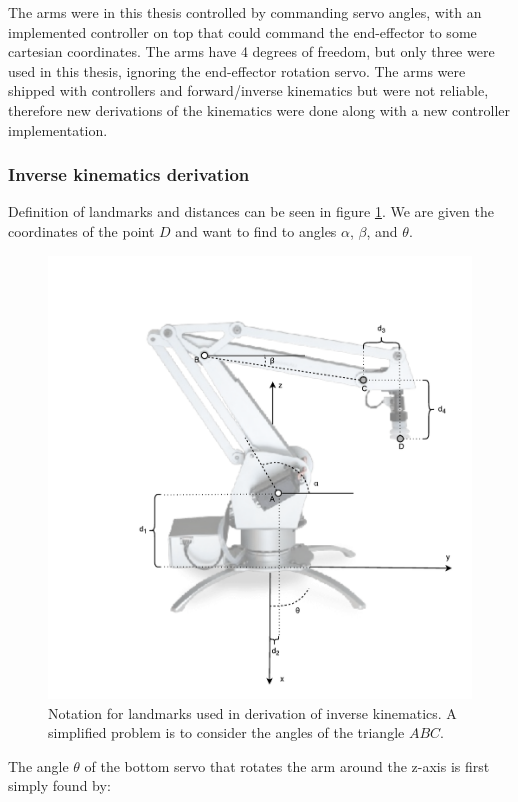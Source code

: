 The arms were in this thesis controlled by commanding servo angles, with an
implemented controller on top that could command the end-effector to some
cartesian coordinates. The arms have 4 degrees of freedom, but only three were
used in this thesis, ignoring the end-effector rotation servo. The arms were
shipped with controllers and forward/inverse kinematics but were not reliable,
therefore new derivations of the kinematics were done along with a new
controller implementation.

\subsubsection{Inverse kinematics derivation}

Definition of landmarks and distances can be seen in figure
\ref{fig:uarm_landmarks}. We are given the coordinates of the point $D$ and
want to find to angles $\alpha$, $\beta$, and $\theta$.

\begin{figure}[!ht]
    \centering
    \includegraphics[width=0.80 \textwidth]{res/inverse_kinematics.pdf}

    \caption{Notation for landmarks used in derivation of inverse kinematics. A
    simplified problem is to consider the angles of the triangle $ABC$.}

    \label{fig:uarm_landmarks}

\end{figure}

The angle $\theta$ of the bottom servo that rotates the arm around the z-axis
is first simply found by:

